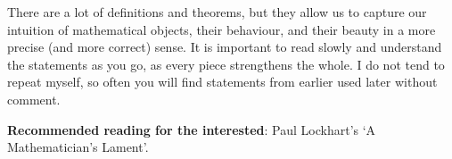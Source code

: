There are a lot of definitions and theorems, but they allow us to capture our intuition of mathematical objects, their behaviour, and their beauty
in a more precise (and more correct) sense. It is important to read slowly and understand the statements as you go, as every piece strengthens the
whole. I do not tend to repeat myself, so often you will find statements from earlier used later without comment.

\textbf{Recommended reading for the interested}: Paul Lockhart's `A Mathematician's Lament'.


